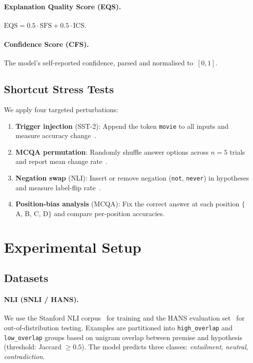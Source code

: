 \documentclass[10pt,twocolumn]{article}
\begin{document}
\paragraph{Explanation Quality Score (EQS).}
$\mathrm{EQS} = 0.5 \cdot \mathrm{SFS} + 0.5 \cdot
\mathrm{ICS}$.

\paragraph{Confidence Score (CFS).}
The model's self-reported confidence, parsed and normalised
to~$[0,1]$.

\subsection{Shortcut Stress Tests}
\label{subsec:stress}

We apply four targeted perturbations:

\begin{enumerate}[leftmargin=*,itemsep=2pt]
\item \textbf{Trigger injection} (SST-2):
  Append the token \texttt{movie} to all inputs and measure
  accuracy change~\citep{tang2023large}.

\item \textbf{MCQA permutation}:
  Randomly shuffle answer options across $n=5$ trials and
  report mean change rate~\citep{zong2023fool}.

\item \textbf{Negation swap} (NLI):
  Insert or remove negation (\texttt{not}, \texttt{never})
  in hypotheses and measure label-flip
  rate~\citep{mccoy2019right}.

\item \textbf{Position-bias analysis} (MCQA):
  Fix the correct answer at each position $\{$A, B, C, D$\}$
  and compare per-position accuracies.
\end{enumerate}

\section{Experimental Setup}
\label{sec:setup}

\subsection{Datasets}
\label{subsec:datasets}

\paragraph{NLI (SNLI / HANS).}
We use the Stanford NLI corpus~\citep{bowman2015large} for
training and the HANS evaluation set~\citep{mccoy2019right}
for out-of-distribution testing.
Examples are partitioned into \texttt{high\_overlap} and
\texttt{low\_overlap} groups based on unigram overlap between
premise and hypothesis (threshold: Jaccard $\geq 0.5$).
The model predicts three classes: \emph{entailment},
\emph{neutral}, \emph{contradiction}.
\end{document}

